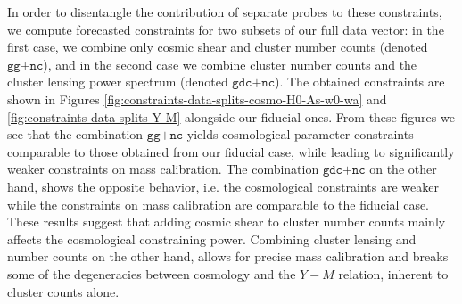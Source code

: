 \documentclass[%
 reprint,
nofootinbib,
 amsmath,amssymb,
 aps,
]{revtex4-1}
\begin{document}
In order to disentangle the contribution of separate probes to these constraints, we compute forecasted constraints for two subsets of our full data vector: in the first case, we combine only cosmic shear and cluster number counts (denoted $\texttt{gg+nc}$), and in the second case we combine cluster number counts and the cluster lensing power spectrum (denoted $\texttt{gdc+nc}$). The obtained constraints are shown in Figures \ref{fig:constraints-data-splits-cosmo-H0-As-w0-wa} and \ref{fig:constraints-data-splits-Y-M} alongside our fiducial ones. From these figures we see that the combination $\texttt{gg+nc}$ yields cosmological parameter constraints comparable to those obtained from our fiducial case, while leading to significantly weaker constraints on mass calibration. The combination $\texttt{gdc+nc}$ on the other hand, shows the opposite behavior, i.e. the cosmological constraints are weaker while the constraints on mass calibration are comparable to the fiducial case. These results suggest that adding cosmic shear to cluster number counts mainly affects the cosmological constraining power. Combining cluster lensing and number counts on the other hand, allows for precise mass calibration and breaks some of the degeneracies between cosmology and the $Y-M$ relation, inherent to cluster counts alone. 
\end{document}
